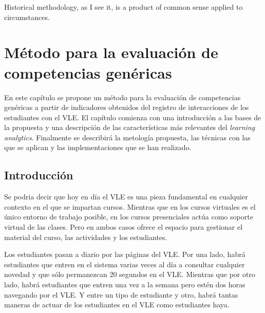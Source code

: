 

\begin{savequote}[50mm]
Historical methodology, as I see it, is a product of common sense applied to circumstances. 
\end{savequote}


\chapter{Método para la evaluación de competencias genéricas}
\label{cha:Overall methodology}

\ifpdf
    \graphicspath{{4_overall_methodology/figures/PNG/}{4_overall_methodology/figures/PDF/}{4_overall_methodology/figures/}}
\else
    \graphicspath{{4_overall_methodology/figures/EPS/}{4_overall_methodology/figures/}}
\fi



En este capítulo se propone un método para la evaluación de competencias genéricas a partir de indicadores obtenidos del registro de interacciones de los estudiantes con el VLE. El capítulo comienza con una introducción a las bases de la propuesta y una descripción de las características más relevantes del \emph{learning analytics}. Finalmente se describirá la metología propuesta, las técnicas con las que se aplican y las implementaciones que se han realizado.

\section{Introducción}

Se podria decir que hoy en día el VLE es una pieza fundamental en cualquier contexto en el que se impartan cursos. Mientras que en los cursos virtuales es el único entorno de trabajo posible, en los cursos presenciales actúa como soporte virtual de las clases. Pero en ambos casos ofrece el espacio para gestionar el material del curso, las actividades y los estudiantes. 

Los estudiantes pasan a diario por las páginas del VLE. Por una lado, habrá estudiantes que entren en el sistema varias veces al día a consultar cualquier novedad y que sólo permanezcan 20 segundos en el VLE. Mientras que por otro lado, habrá estudiantes que entren una vez a la semana pero estén dos horas navegando por el VLE. Y entre un tipo de estudiante y otro, habrá tantas maneras de actuar de los estudiantes en el VLE como estudiantes haya. 

